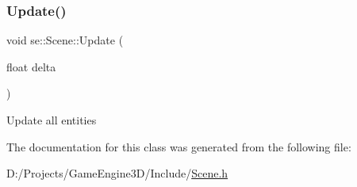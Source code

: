 \subsubsection{\texorpdfstring{Update()}{Update()}}
{\footnotesize\ttfamily void se\+::\+Scene\+::\+Update (\begin{DoxyParamCaption}\item[{float}]{delta }\end{DoxyParamCaption})}

Update all entities 

The documentation for this class was generated from the following file\+:\begin{DoxyCompactItemize}
\item 
D\+:/\+Projects/\+Game\+Engine3\+D/\+Include/\mbox{\hyperlink{_scene_8h}{Scene.\+h}}\end{DoxyCompactItemize}
